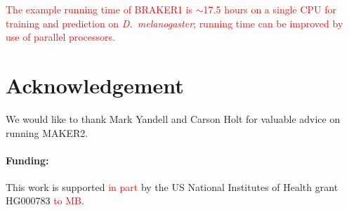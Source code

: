 \documentclass[a4paper,10pt]{article}
\begin{document}
\textcolor{red}{The example running time of BRAKER1 is $\sim$17.5 hours on a single CPU for training and prediction on \textit{D.~melanogaster}; running time can be improved by use of parallel processors.}


\section*{Acknowledgement}

We would like to thank Mark Yandell and Carson Holt for valuable advice on running MAKER2.

\paragraph{Funding:} This work is supported \textcolor{red}{in part} by the US National Institutes of Health grant HG000783 \textcolor{red}{to MB}.

%
%
%
%
%
%
%
%
%
\end{document}
